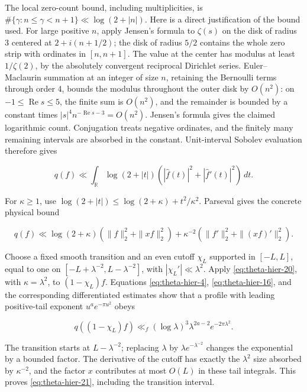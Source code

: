 The local zero-count bound, including multiplicities, is
$\#\{\gamma:n\le\gamma<n+1\}\ll\log(2+|n|)$. Here is a direct justification of the bound used. For large positive $n$, apply Jensen's formula to $\zeta(s)$ on the disk of radius $3$ centered at $2+i(n+1/2)$; the disk of radius $5/2$ contains the whole zero strip with ordinates in $[n,n+1]$. The value at the center has modulus at least $1/\zeta(2)$, by the absolutely convergent reciprocal Dirichlet series. Euler--Maclaurin summation at an integer of size $n$, retaining the Bernoulli terms through order $4$, bounds the modulus throughout the outer disk by $O(n^2)$: on $-1\le\operatorname{Re}s\le5$, the finite sum is $O(n^2)$, and the remainder is bounded by a constant times $|s|^4 n^{-\operatorname{Re}s-3}=O(n^2)$. Jensen's formula gives the claimed logarithmic count. Conjugation treats negative ordinates, and the finitely many remaining intervals are absorbed in the constant. Unit-interval Sobolev evaluation therefore gives

\begin{equation}
q(f)\ll\int_{\mathbb R}\log(2+|t|)
      (|\widehat f(t)|^2+|\widehat f'(t)|^2)\,dt.
 \label{eq:theta-hier-19}
\end{equation}

For $\kappa\ge1$, use
$\log(2+|t|)\le\log(2+\kappa)+t^2/\kappa^2$. Parseval gives the concrete physical bound

\begin{equation}
q(f)\ll \log(2+\kappa)(\|f\|_2^2+\|xf\|_2^2)
     +\kappa^{-2}(\|f'\|_2^2+\|(xf)'\|_2^2).
 \label{eq:theta-hier-20}
\end{equation}

Choose a fixed smooth transition and an even cutoff $\chi_L$ supported in $[-L,L]$, equal to one on $[-L+\lambda^{-2},L-\lambda^{-2}]$, with $|\chi_L'|\ll\lambda^2$. Apply \eqref{eq:theta-hier-20}, with $\kappa=\lambda^2$, to $(1-\chi_L)f$. Equations \eqref{eq:theta-hier-4}, \eqref{eq:theta-hier-16}, and the corresponding differentiated estimates show that a profile with leading positive-tail exponent $u^a e^{-\pi u^2}$ obeys

\begin{equation}
q((1-\chi_L)f)\ll_f
      (\log\lambda)^3\lambda^{2a-2}e^{-2\pi\lambda^2}.
 \label{eq:theta-hier-21}
\end{equation}

The transition starts at $L-\lambda^{-2}$; replacing $\lambda$ by $\lambda e^{-\lambda^{-2}}$ changes the exponential by a bounded factor. The derivative of the cutoff has exactly the $\lambda^2$ size absorbed by $\kappa^{-2}$, and the factor $x$ contributes at most $O(L)$ in these tail integrals. This proves \eqref{eq:theta-hier-21}, including the transition interval.

